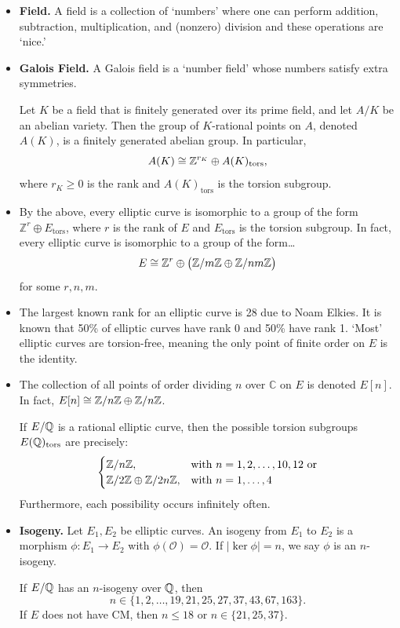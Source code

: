 \documentclass[11pt,letterpaper]{article}
\begin{document}
\begin{itemize}
\item {\bfseries Field.} A field is a collection of `numbers' where one can perform addition, subtraction, multiplication, and (nonzero) division and these operations are `nice.'

\item {\bfseries Galois Field.} A Galois field is a `number field' whose numbers satisfy extra symmetries. 

	\begin{thm*}
	Let $K$ be a field that is finitely generated over its prime field, and let $A/K$ be an abelian variety. Then the group of $K$-rational points on $A$, denoted $A(K)$, is a finitely generated abelian group. In particular,
		\[
		A(K) \cong \mathbb{Z}^{r_K} \oplus A(K)_{\text{tors}},
		\]
	where $r_K \geq 0$ is the rank and $A(K)_{\text{tors}}$ is the torsion subgroup. 
	\end{thm*}

\item By the above, every elliptic curve is isomorphic to a group of the form $\mathbb{Z}^r \oplus E_{\text{tors}}$, where $r$ is the rank of $E$ and $E_{\text{tors}}$ is the torsion subgroup. In fact, every elliptic curve is isomorphic to a group of the form\dots
	\[
	E \cong \mathbb{Z}^r \oplus \big(\mathbb{Z}/m\mathbb{Z} \oplus \mathbb{Z}/nm\mathbb{Z} \big)
	\]
for some $r, n, m$. 

\item The largest known rank for an elliptic curve is 28 due to Noam Elkies. It is known that 50\% of elliptic curves have rank 0 and 50\% have rank 1. `Most' elliptic curves are torsion-free, meaning the only point of finite order on $E$ is the identity. 

\item The collection of all points of order dividing $n$ over $\mathbb{C}$ on $E$ is denoted $E[n]$. In fact, $E[n] \cong \mathbb{Z}/n\mathbb{Z} \oplus \mathbb{Z}/n\mathbb{Z}$.

\begin{thm*}
If $E/\mathbb{Q}$ is a rational elliptic curve, then the possible torsion subgroups $E(\mathbb{Q})_{\text{tors}}$ are precisely:
	\[
	\begin{cases}
	\mathbb{Z}/n\mathbb{Z}, & \text{with } n=1,2,\ldots,10,12 \text{ or} \\
	\mathbb{Z}/2\mathbb{Z} \oplus \mathbb{Z}/2n\mathbb{Z}, & \text{with } n=1,\ldots,4
	\end{cases}
	\]
Furthermore, each possibility occurs infinitely often.
\end{thm*}

\item {\bfseries Isogeny.} Let $E_1,E_2$ be elliptic curves. An isogeny from $E_1$ to $E_2$ is a morphism $\phi: E_1 \to E_2$ with $\phi(\mathcal{O})=\mathcal{O}$. If $|\ker \phi|=n$, we say $\phi$ is an $n$-isogeny. 

	\begin{thm*}
	If $E/\mathbb{Q}$ has an $n$-isogeny over $\mathbb{Q}$, then 
		\[
		n \in \{1,2,\ldots,19,21,25,27,37,43,67,163\}. 
		\]
	If $E$ does not have CM, then $n \leq 18$ or $n \in \{21,25,37\}$. 
	\end{thm*}
\end{itemize}
\end{document}

